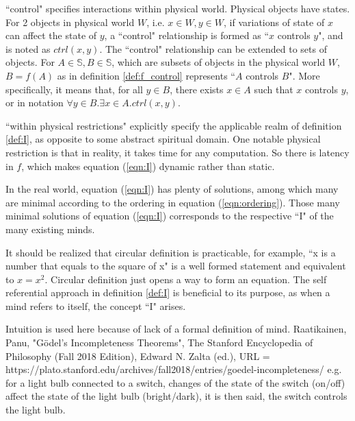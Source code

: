 \documentclass[final,leqno]{siamltex}
\begin{document}
``control" specifies interactions within physical world. Physical objects have states. For 2 objects in physical world $W$, i.e. $x\in W, y\in W$, if variations of state of $x$ can affect the state of $y$,  a ``control" relationship is formed as ``$x$ controls $y$"\cite{light}, and is noted as $ctrl(x,y)$.  The ``control" relationship can be extended to sets of objects. For $A\in\mathbb{S},B\in\mathbb{S}$, which are subsets of objects in the physical world $W$, $B=f(A)$ as in definition \ref{def:f_control} represents ``$A$ controls $B$". More specifically, it means that, for all $y\in B$, there exists $x\in A$ such that $x$ controls $y$, or in notation $\forall y\in B.\exists x\in A.ctrl(x,y)$.

``within physical restrictions" explicitly specify the applicable realm of definition \ref{def:I}, as opposite to some abstract spiritual domain. One notable physical restriction is that in reality, it takes time for any computation. So there is latency in $f$, which makes equation (\ref{eqn:I}) dynamic rather than static.

In the real world, equation (\ref{eqn:I}) has plenty of solutions, among which many are minimal according to the ordering in equation (\ref{eqn:ordering}). Those many minimal solutions of equation (\ref{eqn:I}) corresponds to the respective ``I" of the many existing minds.

It should be realized that circular definition is practicable, for example, ``x is a number that equals to the square of x" is a well formed statement and equivalent to $x=x^2$. Circular definition just opens a way to form an equation. The self referential approach in definition \ref{def:I} is beneficial to its purpose, as when a mind refers to itself, the concept ``I" arises.

 
 
\begin{thebibliography}{10} 
Intuition is used here because of lack of a formal definition of mind.
Raatikainen, Panu, "Gödel's Incompleteness Theorems", The Stanford Encyclopedia of Philosophy (Fall 2018 Edition), Edward N. Zalta (ed.), URL = https://plato.stanford.edu/archives/fall2018/entries/goedel-incompleteness/  
e.g. for a light bulb connected to a switch, changes of the state of the switch (on/off) affect the state of the light bulb (bright/dark), it is then said, the switch controls the light bulb.
\end{thebibliography} 
\end{document}
